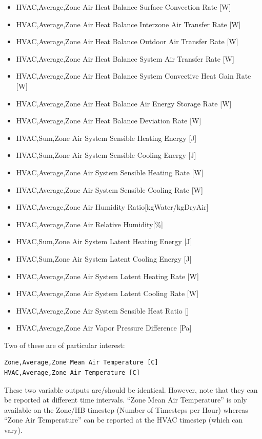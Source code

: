 \begin{itemize}
\item
  HVAC,Average,Zone Air Heat Balance Surface Convection Rate {[}W{]}
\item
  HVAC,Average,Zone Air Heat Balance Interzone Air Transfer Rate {[}W{]}
\item
  HVAC,Average,Zone Air Heat Balance Outdoor Air Transfer Rate {[}W{]}
\item
  HVAC,Average,Zone Air Heat Balance System Air Transfer Rate {[}W{]}
\item
  HVAC,Average,Zone Air Heat Balance System Convective Heat Gain Rate {[}W{]}
\item
  HVAC,Average,Zone Air Heat Balance Air Energy Storage Rate {[}W{]}
\item
  HVAC,Average,Zone Air Heat Balance Deviation Rate {[}W{]}
\item
  HVAC,Sum,Zone Air System Sensible Heating Energy {[}J{]}
\item
  HVAC,Sum,Zone Air System Sensible Cooling Energy {[}J{]}
\item
  HVAC,Average,Zone Air System Sensible Heating Rate {[}W{]}
\item
  HVAC,Average,Zone Air System Sensible Cooling Rate {[}W{]}
\item
  HVAC,Average,Zone Air Humidity Ratio{[}kgWater/kgDryAir{]}
\item
  HVAC,Average,Zone Air Relative Humidity{[}\%{]}
\item
  HVAC,Sum,Zone Air System Latent Heating Energy {[}J{]}
\item
  HVAC,Sum,Zone Air System Latent Cooling Energy {[}J{]}
\item
  HVAC,Average,Zone Air System Latent Heating Rate {[}W{]}
\item
  HVAC,Average,Zone Air System Latent Cooling Rate {[}W{]}
\item
  HVAC,Average,Zone Air System Sensible Heat Ratio {[}{]}
\item
  HVAC,Average,Zone Air Vapor Pressure Difference {[}Pa{]}

\end{itemize}

Two of these are of particular interest:

\begin{lstlisting}
Zone,Average,Zone Mean Air Temperature [C]
HVAC,Average,Zone Air Temperature [C]
\end{lstlisting}

These two variable outputs are/should be identical. However, note that they can be reported at different time intervals. ``Zone Mean Air Temperature'' is only available on the Zone/HB timestep (Number of Timesteps per Hour) whereas ``Zone Air Temperature'' can be reported at the HVAC timestep (which can vary).

